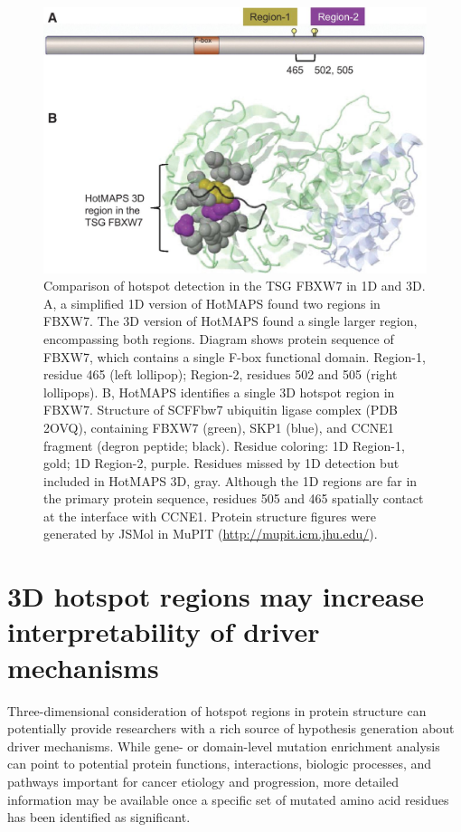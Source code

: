 \begin{figure}
  \centering
  \makeatletter
  \let\@currsize\normalsize
  \includegraphics[width=0.9\linewidth]{figures/chapter5/benefits_3d_space.jpg}
  \caption[Comparison of hotspot detection in the TSG FBXW7 in 1D and 3D.]{Comparison of hotspot detection in the TSG FBXW7 in 1D and 3D. A, a simplified 1D version of HotMAPS found two regions in FBXW7. The 3D version of HotMAPS found a single larger region, encompassing both regions. Diagram shows protein sequence of FBXW7, which contains a single F-box functional domain. Region-1, residue 465 (left lollipop); Region-2, residues 502 and 505 (right lollipops). B, HotMAPS identifies a single 3D hotspot region in FBXW7. Structure of SCFFbw7 ubiquitin ligase complex (PDB 2OVQ), containing FBXW7 (green), SKP1 (blue), and CCNE1 fragment (degron peptide; black). Residue coloring: 1D Region-1, gold; 1D Region-2, purple. Residues missed by 1D detection but included in HotMAPS 3D, gray. Although the 1D regions are far in the primary protein sequence, residues 505 and 465 spatially contact at the interface with CCNE1. Protein structure figures were generated by JSMol in MuPIT (\url{http://mupit.icm.jhu.edu/}).}
  \label{fig:benefits_3d_space}
\end{figure}

\section{3D hotspot regions may increase interpretability of driver mechanisms}

Three-dimensional consideration of hotspot regions in protein structure can potentially provide researchers with a rich source of hypothesis generation about driver mechanisms. While gene- or domain-level mutation enrichment analysis can point to potential protein functions, interactions, biologic processes, and pathways important for cancer etiology and progression, more detailed information may be available once a specific set of mutated amino acid residues has been identified as significant.

